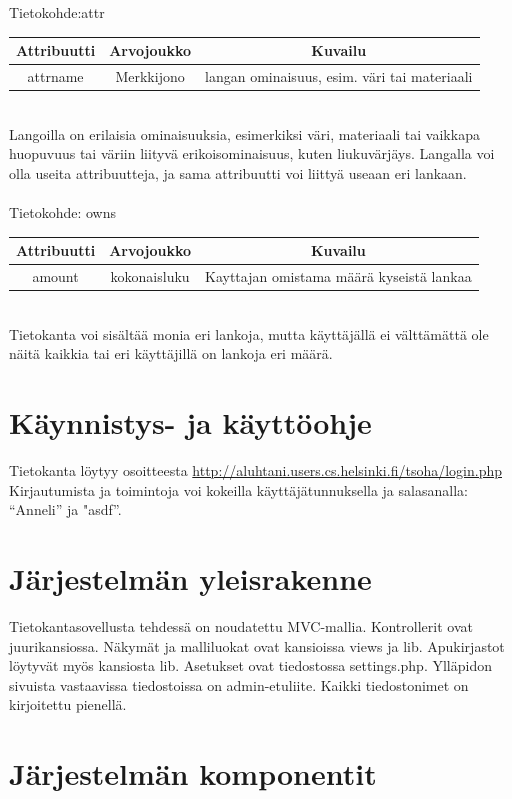 \documentclass[12pt]{article}
\begin{document}
\ \\ \ \\
Tietokohde:attr\\
\begin{tabular}{|c|c|c|}
\hline
Attribuutti & Arvojoukko & Kuvailu \\
\hline
attrname & Merkkijono & langan ominaisuus, esim. väri tai materiaali\\
\hline   
\end{tabular}
\\
Langoilla on erilaisia ominaisuuksia, esimerkiksi väri, materiaali tai vaikkapa huopuvuus tai väriin liityvä erikoisominaisuus, kuten liukuvärjäys. Langalla voi olla useita attribuutteja, ja sama attribuutti voi liittyä useaan eri lankaan. 
\ \\ \ \\
Tietokohde: owns\\
\begin{tabular}{|c|c|c|}
\hline
Attribuutti & Arvojoukko & Kuvailu \\
\hline
amount & kokonaisluku & Kayttajan omistama määrä kyseistä lankaa\\
\hline  
\end{tabular}
\\
Tietokanta voi sisältää monia eri lankoja, mutta käyttäjällä ei välttämättä ole näitä kaikkia tai eri käyttäjillä on lankoja eri määrä. 
\section{Käynnistys- ja käyttöohje}
Tietokanta löytyy osoitteesta \href{http://aluhtani.users.cs.helsinki.fi/tsoha/login.php}{http://aluhtani.users.cs.helsinki.fi/tsoha/login.php}
\\
Kirjautumista ja toimintoja voi kokeilla käyttäjätunnuksella ja salasanalla: ``Anneli'' ja "asdf''.
\section{Järjestelmän yleisrakenne}
Tietokantasovellusta tehdessä on noudatettu MVC-mallia. Kontrollerit ovat juurikansiossa. Näkymät ja malliluokat ovat kansioissa views ja lib. Apukirjastot löytyvät myös kansiosta lib. Asetukset ovat tiedostossa settings.php. Ylläpidon sivuista vastaavissa tiedostoissa on admin-etuliite. Kaikki tiedostonimet on kirjoitettu pienellä. 
\section{Järjestelmän komponentit}
\end{document}
